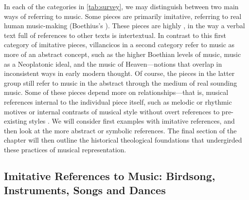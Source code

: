 In each of the categories in \cref{tab:survey}, we may distinguish between two
main ways of referring to music.  
Some pieces are primarily imitative, referring to real human music-making
(Boethius's ).
These pieces are highly , in the way a verbal text full of
references to other texts is intertextual.
In contrast to this first category of imitative pieces, villancicos in a second
category refer to music as more of an abstract concept, such as the higher
Boethian levels of music, music as a Neoplatonic ideal, and the music of
Heaven---notions that overlap in inconsistent ways in early modern thought.
Of course, the pieces in the latter group still refer to music in the abstract
through the medium of real sounding music.  
Some of these pieces depend more on  relationships---that
is, musical references internal to the individual piece itself, such as melodic
or rhythmic motives or internal contrasts of musical style without overt
references to pre-existing styles .
We will consider first examples with imitative references, and then look at the
more abstract or symbolic references.
The final section of the chapter will then outline the historical theological
foundations that undergirded these practices of musical representation.

\subsection{Imitative References to Music: Birdsong, Instruments, Songs and
Dances}

